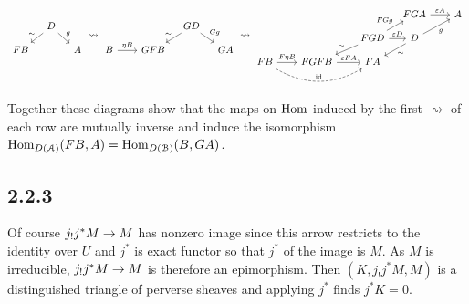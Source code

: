 \documentclass[deligne.tex]{subfiles}
\begin{document}
{\small\begin{ceqn}\begin{equation*}
\begin{tikzcd}[column sep=10pt,row sep=10pt]
	&D\arrow[dl,"\sim"']\arrow[dr,"g"] \\
	FB&&A
\end{tikzcd}
\rightsquigarrow
\begin{tikzcd}[column sep=10pt,row sep=10pt]
	&[10pt]&GD\arrow[dl,"\sim"']\arrow[dr,"Gg"] \\
	B\arrow[r,"\eta B"]&GFB&&GA
\end{tikzcd}
\rightsquigarrow
\begin{tikzcd}[column sep=10pt,row sep=10pt]
	&[10pt]&[10pt]&FGA\arrow[r,"\vep A"]&[10pt]A \\
	&&FGD\arrow[dl,"\sim"']\arrow[r,"\vep D"]\arrow[ur,"FGg"]
	&D\arrow[dl,"\sim"]\arrow[ur,"g"'] \\
	FB\arrow[rr,bend right,dashed,"\id"]\arrow[r,"F\eta B"]
	&FGFB\arrow[r,"\vep FA"]&FA
\end{tikzcd}
\end{equation*}\end{ceqn}}
Together these diagrams show that the maps on $\operatorname{Hom}$ induced by the first
$\rightsquigarrow$ of each row are mutually inverse and induce the 
isomorphism $\operatorname{Hom}_{D(\mathcal A)}(FB,A)=\operatorname{Hom}_{D(\mathcal B)}(B,GA)$.

\subsection*{2.2.3}
Of course $j_!j^*M\rightarrow M$ has nonzero image since this arrow 
restricts to the identity over $U$ and $j^*$ is exact functor so that $j^*$
of the image is $M$. As $M$ is irreducible, $j_!j^*M\rightarrow M$ is therefore an
epimorphism. Then $(K,j_!j^*M,M)$ is a distinguished triangle of perverse
sheaves and applying $j^*$ finds $j^*K=0$.
\end{document}

